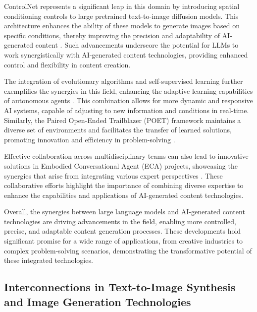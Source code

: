 ControlNet represents a significant leap in this domain by introducing spatial conditioning controls to large pretrained text-to-image diffusion models. This architecture enhances the ability of these models to generate images based on specific conditions, thereby improving the precision and adaptability of AI-generated content \cite{zhang2023adding}. Such advancements underscore the potential for LLMs to work synergistically with AI-generated content technologies, providing enhanced control and flexibility in content creation.



The integration of evolutionary algorithms and self-supervised learning further exemplifies the synergies in this field, enhancing the adaptive learning capabilities of autonomous agents \cite{le2019evolvingselfsupervisedneuralnetworks}. This combination allows for more dynamic and responsive AI systems, capable of adjusting to new information and conditions in real-time. Similarly, the Paired Open-Ended Trailblazer (POET) framework maintains a diverse set of environments and facilitates the transfer of learned solutions, promoting innovation and efficiency in problem-solving \cite{wang2019pairedopenendedtrailblazerpoet}.



Effective collaboration across multidisciplinary teams can also lead to innovative solutions in Embodied Conversational Agent (ECA) projects, showcasing the synergies that arise from integrating various expert perspectives \cite{korre2023takesvillagemultidisciplinaritycollaboration}. These collaborative efforts highlight the importance of combining diverse expertise to enhance the capabilities and applications of AI-generated content technologies.



Overall, the synergies between large language models and AI-generated content technologies are driving advancements in the field, enabling more controlled, precise, and adaptable content generation processes. These developments hold significant promise for a wide range of applications, from creative industries to complex problem-solving scenarios, demonstrating the transformative potential of these integrated technologies.



\subsection{Interconnections in Text-to-Image Synthesis and Image Generation Technologies} \label{subsec:Interconnections in Text-to-Image Synthesis and Image Generation Technologies}



